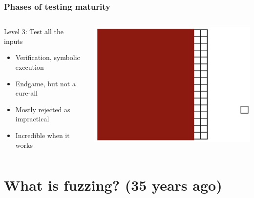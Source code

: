 \documentclass{beamer}
\begin{document}
	\begin{frame}
		\frametitle{Phases of testing maturity}
	\begin{columns}[onlytextwidth]
		\begin{column}{.5\textwidth}
Level 3: Test all the inputs
	\begin{itemize}
		\item{Verification, symbolic execution}
		\item{Endgame, but not a cure-all}
		\item{Mostly rejected as impractical}
		\item{Incredible when it works}
	\end{itemize}
		\end{column}
		\begin{column}{.5\textwidth}
			\centering \includegraphics[scale=.75]{phase3}
		\end{column}
	\end{columns}

\end{frame}

\section[What is fuzzing?]{What is fuzzing? \normalsize{(35 years ago)}}
\end{document}
